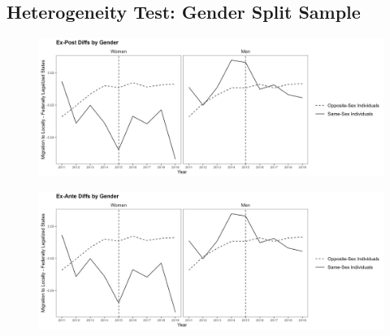\documentclass[12pt,letterpaper]{article}
\begin{document}



\subsection{Heterogeneity Test: Gender Split Sample}
\clearpage

\begin{figure}
    \centering
    \includegraphics[width=1\linewidth]{outputs/summary_stats/sex_post_diffs.png}
    \label{fig:enter-label}
\end{figure}

\centering
\begin{tiny}

\end{tiny}

\begin{figure}
    \centering
    \includegraphics[width=1\linewidth]{outputs/summary_stats/sex_ante_diffs.png}
    \label{fig:enter-label}
\end{figure}

\centering
\begin{tiny}

\end{tiny}
\end{document}
